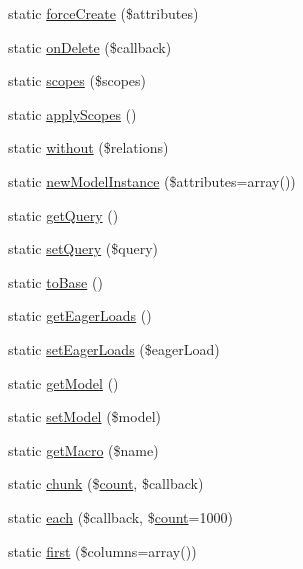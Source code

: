 \begin{DoxyCompactItemize}
\item 
static \mbox{\hyperlink{class_eloquent_a3c4756036067296c077879f3deddbe32}{force\+Create}} (\$attributes)
\item 
static \mbox{\hyperlink{class_eloquent_a41dbb3edd9824b60aa6793e8e4f0d5de}{on\+Delete}} (\$callback)
\item 
static \mbox{\hyperlink{class_eloquent_a30187b0aba1d255c83ca54ade893942a}{scopes}} (\$scopes)
\item 
static \mbox{\hyperlink{class_eloquent_a324fd31d8a6e6391edfb691be4d2c1e4}{apply\+Scopes}} ()
\item 
static \mbox{\hyperlink{class_eloquent_a4d5bb95ee2ccbee4d66d20f96e58a2f8}{without}} (\$relations)
\item 
static \mbox{\hyperlink{class_eloquent_a8526cec0d6d3c0af7baf17035b5bcc9d}{new\+Model\+Instance}} (\$attributes=array())
\item 
static \mbox{\hyperlink{class_eloquent_a4c4d0601b74e31267f0526b02438e155}{get\+Query}} ()
\item 
static \mbox{\hyperlink{class_eloquent_a9f643b610f962c2ebc7a56cb6fcc0f71}{set\+Query}} (\$query)
\item 
static \mbox{\hyperlink{class_eloquent_abc76b992d3cb97247cd15d2d66c6e2d2}{to\+Base}} ()
\item 
static \mbox{\hyperlink{class_eloquent_a2384b7d44541eec22f7d5a34c4bac4a4}{get\+Eager\+Loads}} ()
\item 
static \mbox{\hyperlink{class_eloquent_a546bbd87b7916e506cf6d42d80ad0530}{set\+Eager\+Loads}} (\$eager\+Load)
\item 
static \mbox{\hyperlink{class_eloquent_ab711475432b10dd5e0b8992dd4b47b64}{get\+Model}} ()
\item 
static \mbox{\hyperlink{class_eloquent_af58001ac756944267c404a2ebc585cfc}{set\+Model}} (\$model)
\item 
static \mbox{\hyperlink{class_eloquent_a14eeb1ef9d588a63a99e7e2824cae2bb}{get\+Macro}} (\$name)
\item 
static \mbox{\hyperlink{class_eloquent_a48c14c8ed872ba28234c2697d75235d7}{chunk}} (\$\mbox{\hyperlink{class_eloquent_af7f114e287681eb2333c97d6bf26285d}{count}}, \$callback)
\item 
static \mbox{\hyperlink{class_eloquent_ab30a605412c7b2ba2693d4216db68ef8}{each}} (\$callback, \$\mbox{\hyperlink{class_eloquent_af7f114e287681eb2333c97d6bf26285d}{count}}=1000)
\item 
static \mbox{\hyperlink{class_eloquent_a9a02499790abaadb7a9dc307a2b8403a}{first}} (\$columns=array())

\end{DoxyCompactItemize}
